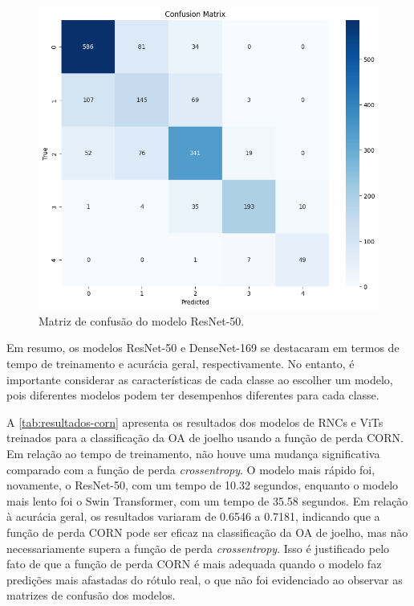 \begin{figure}[h]
    \centering
    \includegraphics[width=\linewidth]{figs/confusion-matrix-resnet50.png}
    \caption{Matriz de confusão do modelo ResNet-50.}
    \label{confusion-matrix-resnet50}
\end{figure}

Em resumo, os modelos ResNet-50 e DenseNet-169 se destacaram em termos de tempo de treinamento e acurácia geral, respectivamente. No entanto, é importante considerar as características de cada classe ao escolher um modelo, pois diferentes modelos podem ter desempenhos diferentes para cada classe.

A \autoref{tab:resultados-corn} apresenta os resultados dos modelos de RNCs e ViTs treinados para a classificação da OA de joelho usando a função de perda CORN. Em relação ao tempo de treinamento, não houve uma mudança significativa comparado com a função de perda \textit{crossentropy}. O modelo mais rápido foi, novamente, o ResNet-50, com um tempo de 10.32 segundos, enquanto o modelo mais lento foi o Swin Transformer, com um tempo de 35.58 segundos. Em relação à acurácia geral, os resultados variaram de 0.6546 a 0.7181, indicando que a função de perda CORN pode ser eficaz na classificação da OA de joelho, mas não necessariamente supera a função de perda \textit{crossentropy}. Isso é justificado pelo fato de que a função de perda CORN é mais adequada quando o modelo faz predições mais afastadas do rótulo real, o que não foi evidenciado ao observar as matrizes de confusão dos modelos.

